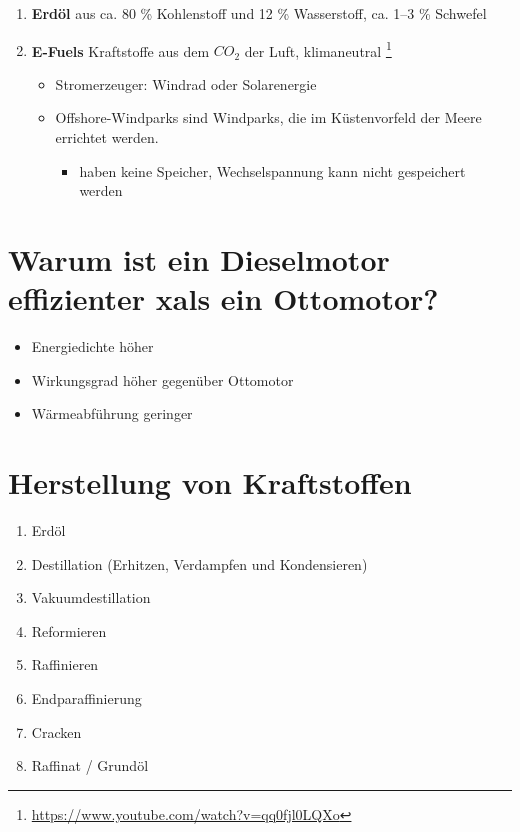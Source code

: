 \begin{enumerate}
\item
  \textbf{Erdöl} aus ca. 80 \% Kohlenstoff und 12 \% Wasserstoff, ca.
  1--3 \% Schwefel
\item
  \textbf{E-Fuels} Kraftstoffe aus dem $CO_2$ der Luft, klimaneutral
  \footnote{\url{https://www.youtube.com/watch?v=qq0fjl0LQXo}}

  \begin{itemize}
  \item
    Stromerzeuger: Windrad oder Solarenergie
  \item
    Offshore-Windparks sind Windparks, die im Küstenvorfeld der Meere
    errichtet werden.

    \begin{itemize}
    \item
      haben keine Speicher, Wechselspannung kann nicht gespeichert
      werden
    \end{itemize}
  \end{itemize}
\end{enumerate}

\section{Warum ist ein Dieselmotor effizienter xals ein
Ottomotor?}\label{warum-ist-ein-dieselmotor-effizienter-xals-ein-ottomotor}

\begin{itemize}
\item
  Energiedichte höher
\item
  Wirkungsgrad höher gegenüber Ottomotor
\item
  Wärmeabführung geringer
\end{itemize}

\section{Herstellung von
Kraftstoffen}\label{herstellung-von-kraftstoffen}

\begin{enumerate}
\item
  Erdöl
\item
  Destillation (Erhitzen, Verdampfen und Kondensieren)
\item
  Vakuumdestillation
\item
  Reformieren
\item
  Raffinieren
\item
  Endparaffinierung\\
\item
  Cracken
\item
  Raffinat / Grundöl
\end{enumerate}

